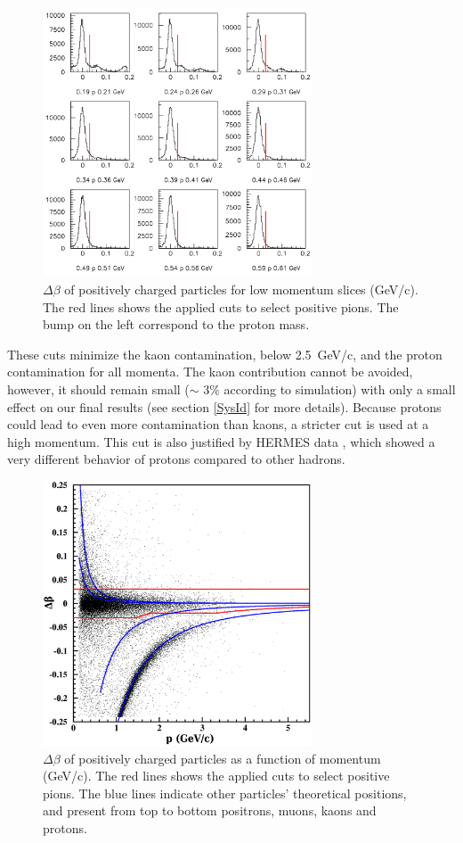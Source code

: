 \begin{figure}[tbp]
\centering
\includegraphics[width=8cm] {answer-fig/TofProfile1.png} 
\caption {$\Delta \beta$ of positively charged particles for low momentum slices 
(GeV/c). The red lines shows the applied cuts to select positive pions. The bump on the left
correspond to the proton mass.}
\label{TOF-3}
\end{figure}

These cuts minimize the kaon contamination, below 2.5~GeV/c, and the 
proton contamination for all momenta. The kaon contribution cannot be avoided, however, it should remain small ($\sim$ 3\% according to simulation) 
with only a small effect on our final results (see section \ref{SysId} 
for more details). Because protons could lead to even more contamination than kaons, 
a stricter cut is used at a high momentum. This cut is also justified by 
HERMES data \cite{Airapetian:2007vu}, which showed a very different behavior of protons compared to other hadrons.

\begin{figure}[tbp]
\centering
\includegraphics[width=8cm] {chap5-fig/pip_data.png} 
\caption {$\Delta \beta$ of positively charged particles as a function of momentum (GeV/c). The red lines shows the applied cuts to select positive pions. The blue lines indicate other particles' theoretical positions, and present from top to 
bottom positrons, muons, kaons and protons.}
\label{PipTOF}
\end{figure}

